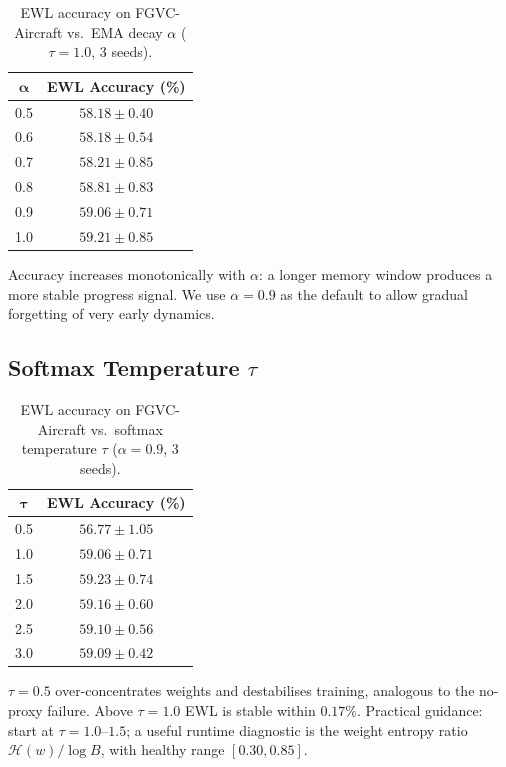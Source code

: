 \begin{table}[h]
  \centering
  \caption{
    EWL accuracy on FGVC-Aircraft vs.\ EMA decay $\alpha$
    ($\tau{=}1.0$, 3 seeds).
  }
  \label{tab:alpha_sweep}
  \begin{tabular}{cc}
    \toprule
    $\boldsymbol{\alpha}$ & \textbf{EWL Accuracy (\%)} \\
    \midrule
    0.5 & $58.18 \pm 0.40$ \\
    0.6 & $58.18 \pm 0.54$ \\
    0.7 & $58.21 \pm 0.85$ \\
    0.8 & $58.81 \pm 0.83$ \\
    0.9 & $59.06 \pm 0.71$ \\
    1.0 & $59.21 \pm 0.85$ \\
    \bottomrule
  \end{tabular}
\end{table}

Accuracy increases monotonically with $\alpha$: a longer memory window produces
a more stable progress signal.
We use $\alpha{=}0.9$ as the default to allow gradual forgetting of very early
dynamics.

\subsection{Softmax Temperature $\tau$}

\begin{table}[h]
  \centering
  \caption{
    EWL accuracy on FGVC-Aircraft vs.\ softmax temperature $\tau$
    ($\alpha{=}0.9$, 3 seeds).
  }
  \label{tab:tau_sweep}
  \begin{tabular}{cc}
    \toprule
    $\boldsymbol{\tau}$ & \textbf{EWL Accuracy (\%)} \\
    \midrule
    0.5 & $56.77 \pm 1.05$ \\
    1.0 & $59.06 \pm 0.71$ \\
    1.5 & $59.23 \pm 0.74$ \\
    2.0 & $59.16 \pm 0.60$ \\
    2.5 & $59.10 \pm 0.56$ \\
    3.0 & $59.09 \pm 0.42$ \\
    \bottomrule
  \end{tabular}
\end{table}

$\tau{=}0.5$ over-concentrates weights and destabilises training, analogous to
the no-proxy failure.
Above $\tau{=}1.0$ EWL is stable within $0.17\%$.
Practical guidance: start at $\tau{=}1.0$--$1.5$; a useful runtime diagnostic
is the weight entropy ratio $\mathcal{H}(w)/\log B$, with healthy range
$[0.30, 0.85]$.

